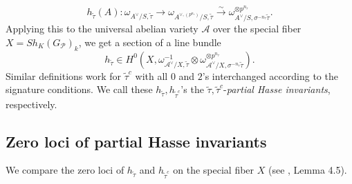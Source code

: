\documentclass{article}
\begin{document}
\begin{itemize}
		\begin{equation}
			h_{\tilde\tau}(A):\omega_{A^\vee/S,\tilde\tau}\longrightarrow\omega_{A^{\vee,(p^{n_\tau})}/S,\tilde\tau}\stackrel{\sim}{\longrightarrow}\omega^{\otimes p^{n_\tau}}_{A^\vee/S,\sigma^{-n_\tau}\tilde\tau}.
		\end{equation}
Applying this to the universal abelian variety $\mathcal{A}$ over the special fiber $X=Sh_K(G_{\mathcal{P}})_k$, we get a section of a line bundle
		\begin{equation}\label{Hasse}
			h_{\tilde\tau}\in H^0(X,\omega_{\mathcal{A}^\vee/X,\tilde\tau}^{-1}\otimes\omega^{\otimes p^{n_\tau}}_{\mathcal{A}^\vee/X,\sigma^{-n_\tau}\tilde\tau}).
		\end{equation}
Similar definitions work for $\tilde\tau^c$ with all $0$ and $2$'s interchanged according to the signature conditions. We call these $h_{\tilde\tau},h_{\tilde\tau^c}$'s the $\tilde\tau,\tilde\tau^c$-\emph{partial Hasse invariants}, respectively.

\end{itemize}



\subsection{Zero loci of partial Hasse invariants}\label{Zero loci}

We compare the zero loci of $h_{\tilde\tau}$ and $h_{\tilde\tau^c}$ on the special fiber $X$ (see \citep{Tian-Xiao}, Lemma 4.5).
\end{document}
